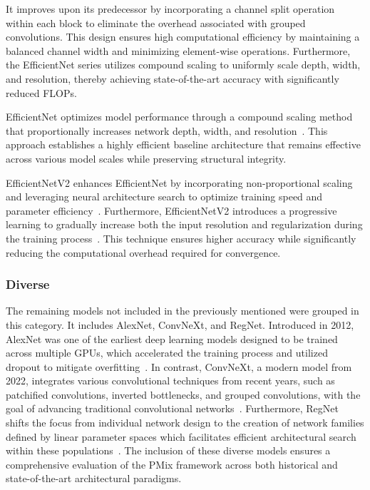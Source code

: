 \documentclass[final,3p,times,twocolumn]{elsarticle}
\begin{document}
It improves upon its predecessor by incorporating a channel split operation within each block to eliminate the overhead associated with grouped convolutions.
This design ensures high computational efficiency by maintaining a balanced channel width and minimizing element-wise operations.
Furthermore, the EfficientNet series utilizes compound scaling to uniformly scale depth, width, and resolution, thereby achieving state-of-the-art accuracy with significantly reduced \glspl{FLOP}.

EfficientNet optimizes model performance through a compound scaling method that proportionally increases network depth, width, and resolution~\cite{EfficientNet}.
This approach establishes a highly efficient baseline architecture that remains effective across various model scales while preserving structural integrity.

EfficientNetV2 enhances EfficientNet by incorporating non-proportional scaling and leveraging neural architecture search to optimize training speed and parameter efficiency~\cite{EfficientNetV2}.
Furthermore, EfficientNetV2 introduces a progressive learning to gradually increase both the input resolution and regularization during the training process~\cite{EfficientNetV2}.
This technique ensures higher accuracy while significantly reducing the computational overhead required for convergence.

\subsubsection{Diverse}

The remaining models not included in the previously mentioned were grouped in this category. It includes AlexNet, ConvNeXt, and RegNet. 
Introduced in 2012, AlexNet was one of the earliest deep learning models designed to be trained across multiple GPUs, which accelerated the training process and utilized dropout to mitigate overfitting~\cite{AlexNet}.
In contrast, ConvNeXt, a modern model from 2022, integrates various convolutional techniques from recent years, such as patchified convolutions, inverted bottlenecks, and grouped convolutions, with the goal of advancing traditional convolutional networks~\cite{ConvNeXt}.
Furthermore, RegNet shifts the focus from individual network design to the creation of network families defined by linear parameter spaces which facilitates efficient architectural search within these populations~\cite{RegNet}.
The inclusion of these diverse models ensures a comprehensive evaluation of the \gls{PMix} framework across both historical and state-of-the-art architectural paradigms.
\end{document}
